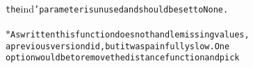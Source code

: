 {{\begin{tabbing}
\\
{\texttt{\hspace{72pt}the\hspace{6pt}{'}}}ind{\texttt{{'}\hspace{6pt}parameter\hspace{6pt}is\hspace{6pt}unused\hspace{6pt}and\hspace{6pt}should\hspace{6pt}be\hspace{6pt}set\hspace{6pt}to\hspace{6pt}None.}}\\
\\
{\texttt{\hspace{72pt}$\ast$\hspace{6pt}As\hspace{6pt}written\hspace{6pt}this\hspace{6pt}function\hspace{6pt}does\hspace{6pt}not\hspace{6pt}handle\hspace{6pt}missing\hspace{6pt}values,}}\\
{\texttt{\hspace{84pt}a\hspace{6pt}previous\hspace{6pt}version\hspace{6pt}did,\hspace{6pt}but\hspace{6pt}it\hspace{6pt}was\hspace{6pt}painfully\hspace{6pt}slow.\hspace{6pt}One}}\\
{\texttt{\hspace{84pt}option\hspace{6pt}would\hspace{6pt}be\hspace{6pt}to\hspace{6pt}remove\hspace{6pt}the\hspace{6pt}distance\hspace{6pt}function\hspace{6pt}and\hspace{6pt}pick}}\\

\end{tabbing}}}
